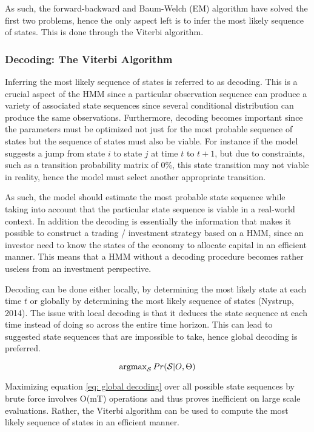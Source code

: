 As such, the forward-backward and Baum-Welch (EM) algorithm have solved the first two problems, hence the only aspect left is to infer the most likely sequence of states. This is done through the Viterbi algorithm. 
 
\subsubsection{Decoding: The Viterbi Algorithm}
\label{subsection: Decoding}
Inferring the most likely sequence of states is referred to as decoding. This is a crucial aspect of the HMM since a particular observation sequence can produce a variety of associated state sequences since several conditional distribution can produce the same observations. Furthermore, decoding becomes important since the parameters must be optimized not just for the most probable sequence of states but the sequence of states must also be viable. For instance if the model suggests a jump from state $i$ to state $j$ at time $t$ to $t+1$, but due to constraints, such as a transition probability matrix of 0\%, this state transition may not viable in reality, hence the model must select another appropriate transition. 

As such, the model should estimate the most probable state sequence while taking into account that the particular state sequence is viable in a real-world context. In addition the decoding is essentially the information that makes it possible to construct a trading / investment strategy based on a HMM, since an investor need to know the states of the economy to allocate capital in an efficient manner. This means that a HMM without a decoding procedure becomes rather useless from an investment perspective. 

Decoding can be done either locally, by determining the most likely state at each time $t$ or globally by determining the most likely sequence of states (Nystrup, 2014). The issue with local decoding is that it deduces the state sequence at each time instead of doing so across the entire time horizon. This can lead to suggested state sequences that are impossible to take, hence global decoding is preferred. 

\begin{equation}
    \operatorname{argmax}_{\mathcal{S}}Pr(\mathcal{S}|O, \Theta)
    \label{eq: global decoding}
\end{equation}

Maximizing equation \ref{eq: global decoding} over all possible state sequences by brute force involves O(mT) operations and thus proves inefficient on large scale evaluations. Rather, the Viterbi algorithm can be used to compute
the most likely sequence of states in an efficient manner. 

